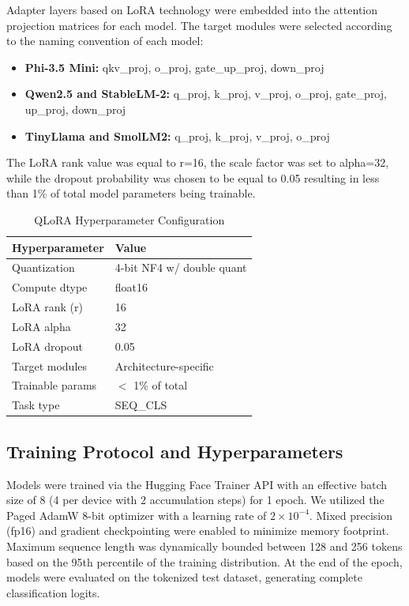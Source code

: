 \documentclass[journal]{IEEEtran}
\begin{document}
Adapter layers based on LoRA technology were embedded into the attention
projection matrices for each model. The target modules were selected
according to the naming convention of each model:
\begin{itemize}
    \item \textbf{Phi-3.5 Mini:} qkv\_proj, o\_proj, gate\_up\_proj, down\_proj
    \item \textbf{Qwen2.5 and StableLM-2:} q\_proj, k\_proj, v\_proj, o\_proj, gate\_proj, up\_proj, down\_proj
    \item \textbf{TinyLlama and SmolLM2:} q\_proj, k\_proj, v\_proj, o\_proj
\end{itemize}

The LoRA rank value was equal to r=16, the scale factor was set to
alpha=32, while the dropout probability was chosen to be equal to 0.05
resulting in less than 1\% of total model parameters being trainable.

\begin{table}[htbp]
\caption{QLoRA Hyperparameter Configuration}
\label{tab:qlora}
\centering
\begin{tabular}{ll}
\toprule
\textbf{Hyperparameter} & \textbf{Value} \\
\midrule
Quantization & 4-bit NF4 w/ double quant \\
Compute dtype & float16 \\
LoRA rank (r) & 16 \\
LoRA alpha & 32 \\
LoRA dropout & 0.05 \\
Target modules & Architecture-specific \\
Trainable params & $<$ 1\% of total \\
Task type & SEQ\_CLS \\
\bottomrule
\end{tabular}
\end{table}

\subsection{Training Protocol and Hyperparameters}

Models were trained via the Hugging Face Trainer API with an effective batch size of 8 (4 per device with 2 accumulation steps) for 1 epoch. We utilized the Paged AdamW 8-bit optimizer with a learning rate of $2 \times 10^{-4}$. Mixed precision (fp16) and gradient checkpointing were enabled to minimize memory footprint. Maximum sequence length was dynamically bounded between 128 and 256 tokens based on the 95th percentile of the training distribution. At the end of the epoch, models were evaluated on the tokenized test dataset, generating complete classification logits.
\end{document}
